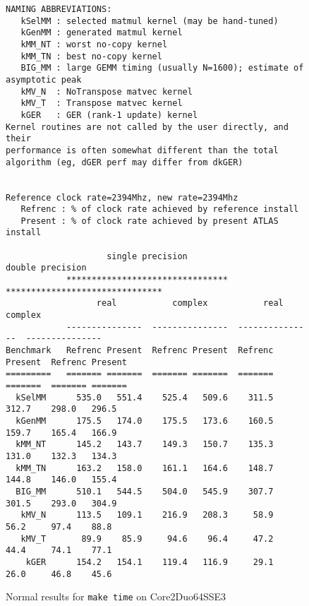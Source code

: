 \documentclass[11pt]{article}
\begin{document}
\begin{figure}[p]
\begin{footnotesize}
\begin{verbatim}
NAMING ABBREVIATIONS:
   kSelMM : selected matmul kernel (may be hand-tuned)
   kGenMM : generated matmul kernel
   kMM_NT : worst no-copy kernel
   kMM_TN : best no-copy kernel
   BIG_MM : large GEMM timing (usually N=1600); estimate of asymptotic peak
   kMV_N  : NoTranspose matvec kernel
   kMV_T  : Transpose matvec kernel
   kGER   : GER (rank-1 update) kernel
Kernel routines are not called by the user directly, and their
performance is often somewhat different than the total
algorithm (eg, dGER perf may differ from dkGER)


Reference clock rate=2394Mhz, new rate=2394Mhz
   Refrenc : % of clock rate achieved by reference install
   Present : % of clock rate achieved by present ATLAS install

                    single precision                  double precision
            ********************************   *******************************
                  real           complex           real           complex
            ---------------  ---------------  ---------------  ---------------
Benchmark   Refrenc Present  Refrenc Present  Refrenc Present  Refrenc Present
=========   ======= =======  ======= =======  ======= =======  ======= =======
  kSelMM      535.0   551.4    525.4   509.6    311.5   312.7    298.0   296.5
  kGenMM      175.5   174.0    175.5   173.6    160.5   159.7    165.4   166.9
  kMM_NT      145.2   143.7    149.3   150.7    135.3   131.0    132.3   134.3
  kMM_TN      163.2   158.0    161.1   164.6    148.7   144.8    146.0   155.4
  BIG_MM      510.1   544.5    504.0   545.9    307.7   301.5    293.0   304.9
   kMV_N      113.5   109.1    216.9   208.3     58.9    56.2     97.4    88.8
   kMV_T       89.9    85.9     94.6    96.4     47.2    44.4     74.1    77.1
    kGER      154.2   154.1    119.4   116.9     29.1    26.0     46.8    45.6
\end{verbatim}
\end{footnotesize}
\caption{Normal results for {\tt make time} on Core2Duo64SSE3}
\label{fig-tim}
\end{figure}
\end{document}
